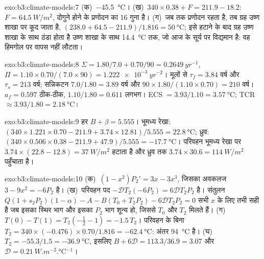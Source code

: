 \begin{solution}{exo:b3:climate-models:7}
(क)~\qty{-45.5}{\celsius}। (ख)~$340\times0.38 + F = 211.9 - 18.2$: $F =
\qty{64.5}{W/m^2}$, दोगुने होने के प्रणोदन का 16 गुना है। (ग)~जब तक
प्रणोदन रहता है, तब ग्रह उष्ण शाखा पर कूद जाता है, $(238.0 + 64.5 -
211.9)/1.816 = \qty{50}{\celsius}$; इसे हटाने के बाद ग्रह उष्ण शाखा के साथ ठंडा होता है
उष्ण शाखा के साथ \qty{14.4}{\celsius} तक, जो आज के सूर्य पर विद्यमान है:
वह हिमगोल पर वापस नहीं लौटता।
\end{solution}

\begin{solution}{exo:b3:climate-models:8}
$\Sigma = 1.80/7.0 + 0.70/90 = \qty{0.2649}{yr^{-1}}$, $\Pi = 1.10\times0.70/
(7.0\times90) = \qty{1.222e-3}{yr^{-2}}$। मूलों से $\tau_f =
\num{3.84}\text{ वर्ष}$ और $\tau_s = \num{213}\text{ वर्ष}$; सन्निकटन
$7.0/1.80 = \num{3.89}\text{ वर्ष}$ और $90\times1.80/(1.10\times0.70) =
\num{210}\text{ वर्ष}$। $a_f = 0.597$ ठीक-ठीक, $1.10/1.80 = 0.611$
लगभग। ECS $= 3.93/1.10 = \qty{3.57}{\celsius}$; TCR $\approx
3.93/1.80 = \qty{2.18}{\celsius}$।
\end{solution}

\begin{solution}{exo:b3:climate-models:9}
हर $B + \beta = \num{5.555}$। भूमध्य रेखा: $(340\times1.221\times0.70 -
211.9 + 3.74\times12.81)/5.555 = \qty{22.8}{\celsius}$; ध्रुव:
$(340\times0.506\times0.38 - 211.9 + 47.9)/5.555 = \qty{-17.7}{\celsius}$।
परिवहन भूमध्य रेखा पर $3.74\times(22.8 - 12.8) = \qty{37}{W/m^2}$ हटाता है
और ध्रुव तक $3.74\times30.6 = \qty{114}{W/m^2}$ पहुँचाता है।
\end{solution}

\begin{solution}{exo:b3:climate-models:10}
(क)~$(1 - x^2)P_2' = 3x - 3x^3$, जिसका अवकलज $3 - 9x^2 = -6P_2$ है।
(ख)~परिवहन पद $-\mathcal D T_2(-6P_2) = 6\mathcal DT_2P_2$ है।
संतुलन $Q(1 + s_2P_2)(1 - \alpha) - A - B(T_0 + T_2P_2) - 6\mathcal
DT_2P_2 = 0$ सभी $x$ के लिए तभी सही है जब इसका स्थिर भाग और इसका $P_2$ भाग
शून्य हो, जिससे $T_0$ और $T_2$ मिलते हैं। (ग)~$T(0) - T(1) = T_2(-\tfrac12 - 1)
= -1.5\,T_2$। परिवहन के बिना $T_2 = 340\times(-0.476)\times0.70/1.816 =
\qty{-62.4}{\celsius}$: अंतर \qty{94}{\celsius} है। (घ)~$T_2 =
-55.3/1.5 = \qty{-36.9}{\celsius}$, इसलिए $B + 6\mathcal D = 113.3/36.9 =
3.07$ और $\mathcal D = \qty{0.21}{W.m^{-2}.\celsius^{-1}}$।
\end{solution}

